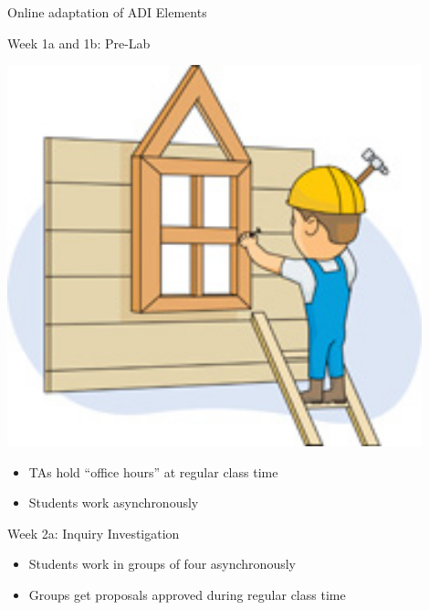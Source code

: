 \documentclass[xcolor=dvipsnames,table]{beamer}
\begin{document}
{\begin{frame}{Online adaptation of ADI Elements}
  \begin{block}{Week 1a and 1b: Pre-Lab}
    \begin{minipage}{0.2\textwidth}
      \centering \includegraphics[width=0.9\textwidth]{./clipart/house.jpg}
    \end{minipage}\hfill
    \begin{minipage}{0.75\textwidth}
      \begin{itemize}
        \item TAs hold ``office hours'' at regular class time
        \item Students work asynchronously
      \end{itemize}
    \end{minipage}
  \end{block}
  \begin{block}{Week 2a: Inquiry Investigation}
    \begin{minipage}{0.75\textwidth}
      \begin{itemize}
        \item Students work in groups of four asynchronously
        \item Groups get proposals approved during regular class time
      \end{itemize}
    \end{minipage}\hfill
    \begin{minipage}{0.2\textwidth}

\end{minipage}
\end{block}
\end{frame}}
\end{document}
